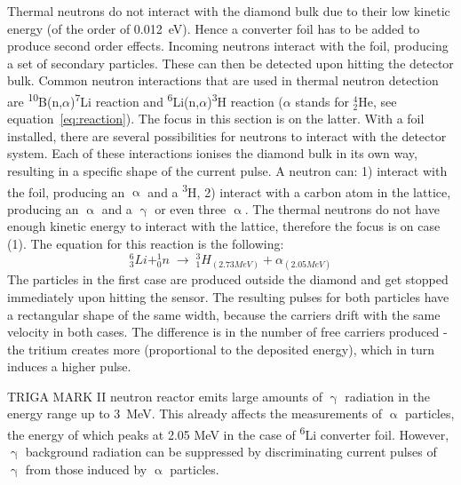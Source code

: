 Thermal neutrons do not interact with the diamond bulk due to their low kinetic energy (of the order of 0.012~eV). Hence a converter foil has to be added to produce second order effects. Incoming neutrons interact with the foil, producing a set of secondary particles. These can then be detected upon hitting the detector bulk. Common neutron interactions that are used in thermal neutron detection are \textsuperscript{10}B(n,$\alpha$)\textsuperscript{7}Li reaction and \textsuperscript{6}Li(n,$\alpha$)\textsuperscript{3}H reaction ($\alpha$ stands for $^4_2$He, see equation~\ref{eq:reaction}). The focus in this section is on the latter. With a foil installed, there are several possibilities for neutrons to interact with the detector system. Each of these interactions ionises the diamond bulk in its own way, resulting in a specific shape of the current pulse. A neutron can: 1) interact with the foil, producing an $\upalpha$ and a \textsuperscript{3}H, 2) interact with a carbon atom in the lattice, producing an $\upalpha$ and a $\upgamma$ or even three $\upalpha$. The thermal neutrons do not have enough kinetic energy to interact with the lattice, therefore the focus is on case (1). The equation for this reaction is the following:
\begin{equation}
\label{eq:reaction}
   ^6_3Li   +   ^1_0n \;\rightarrow\; ^3_1H_{(2.73 MeV)} + \alpha_{(2.05 MeV)}
\end{equation}
The particles in the first case are produced outside the diamond and get stopped immediately upon hitting the sensor. The resulting pulses for both particles have a rectangular shape of the same width, because the carriers drift with the same velocity in both cases. The difference is in the number of free carriers produced - the tritium creates more (proportional to the deposited energy), which in turn induces a higher pulse.

TRIGA MARK II neutron reactor emits large amounts of $\upgamma$ radiation in the energy range up to 3~MeV. This already affects the measurements of $\upalpha$ particles, the energy of which peaks at 2.05 MeV in the case of \textsuperscript{6}Li converter foil. However, $\upgamma$ background radiation can be suppressed by discriminating current pulses of $\upgamma$ from those induced by $\upalpha$ particles. 

